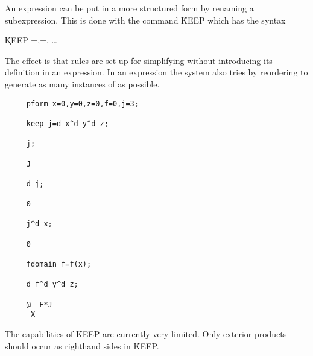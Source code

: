An expression can be put in a more structured form by renaming a
subexpression.  This is done with the command \f{KEEP} which
has the syntax \label{KEEP}
\hypertarget{command:KEEP}{}

\hspace*{2em} \k{KEEP}
=,=, \ldots

The effect is that rules are set up for simplifying  without
introducing its definition in an expression. In an expression the system
also tries by reordering to generate as many instances of  as
possible.

\example{}

\begin{verbatim}
     pform x=0,y=0,z=0,f=0,j=3;

     keep j=d x^d y^d z;

     j;

     J

     d j;

     0

     j^d x;

     0

     fdomain f=f(x);

     d f^d y^d z;

     @  F*J
      X
\end{verbatim}

The capabilities of \f{KEEP} are currently very limited.  Only exterior
products should occur as righthand sides in \f{KEEP}.

\pagebreak
